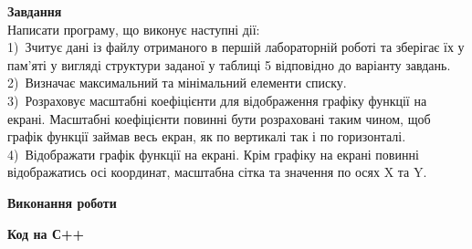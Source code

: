 \documentclass[a4paper,14pt]{extreport}
\begin{document}
\textbf{Завдання}\\
Написати програму, що виконує наступні дії:\\

1) Зчитує дані із файлу отриманого в першій лабораторній роботі та зберігає їх у пам’яті у вигляді структури заданої у таблиці 5 відповідно до варіанту завдань.\\

2) Визначає максимальний та мінімальний елементи списку.\\

3) Розраховує масштабні коефіцієнти для відображення графіку функції на екрані. Масштабні коефіцієнти повинні бути розраховані таким чином, щоб графік функції займав весь екран, як по вертикалі так і по горизонталі.\\

4) Відображати графік функції на екрані. Крім графіку на екрані повинні відображатись осі координат, масштабна сітка та значення по осях X та Y.\\



\vspace{0.3cm}
\begin{center}\textbf{Виконання роботи}\end{center}
\textbf{Код на С++}\\






\begin{figure}[h]
\end{figure}
\end{document}
